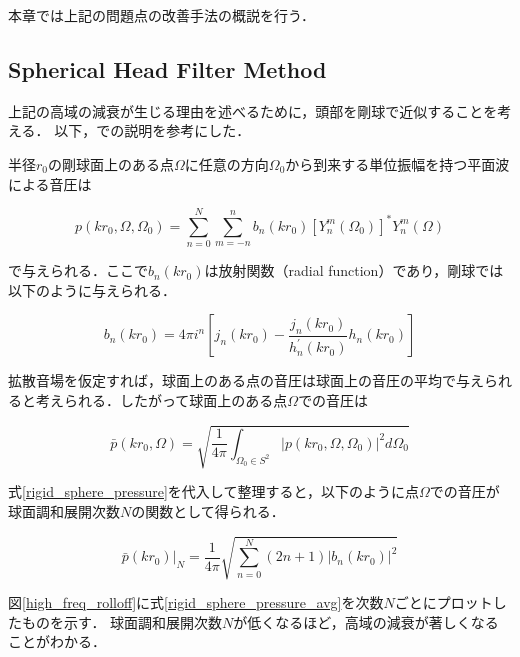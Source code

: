 \documentclass[a4paper]{jsarticle}
\begin{document}
本章では上記の問題点の改善手法の概説を行う．

\subsection{Spherical Head Filter Method \cite{Ben-Hur2017-gm,Sheaffer2014-bo}}

上記の高域の減衰が生じる理由を述べるために，頭部を剛球で近似することを考える．
以下，\cite{Ben-Hur2017-gm}での説明を参考にした．

半径$r_0$の剛球面上のある点$\Omega$に任意の方向$\Omega_0$から到来する単位振幅を持つ平面波による音圧は

\begin{equation}
    \label{rigid_sphere_pressure}
    p\left(k r_{0}, \Omega, \Omega_{0}\right)=\sum_{n=0}^{N} \sum_{m=-n}^{n} b_{n}\left(k r_{0}\right)\left[Y_{n}^{m}\left(\Omega_{0}\right)\right]^{*} Y_{n}^{m}(\Omega)
\end{equation}

で与えられる．ここで$b_n(kr_0)$は放射関数（radial function）であり，剛球では以下のように与えられる．

$$
    b_{n}\left(k r_{0}\right)=4 \pi i^{n}\left[j_{n}\left(k r_{0}\right)-\frac{j_{n}\left(k r_{0}\right)}{h_{n}^{\prime}\left(k r_{0}\right)} h_{n}\left(k r_{0}\right)\right]
$$

拡散音場を仮定すれば，球面上のある点の音圧は球面上の音圧の平均で与えられると考えられる．したがって球面上のある点$\Omega$での音圧は

$$
    \bar{p}\left(k r_{0}, \Omega\right)=\sqrt{\frac{1}{4 \pi} \int_{\Omega_{0} \in S^{2}}\left|p\left(k r_{0}, \Omega, \Omega_{0}\right)\right|^{2} d \Omega_{0}}
$$

式\ref{rigid_sphere_pressure}を代入して整理すると，以下のように点$\Omega$での音圧が球面調和展開次数$N$の関数として得られる．


\begin{equation}
    \label{rigid_sphere_pressure_avg}
    \left.\bar{p}\left(k r_{0}\right)\right|_{N}=\frac{1}{4 \pi} \sqrt{\sum_{n=0}^{N}(2 n+1)\left|b_{n}\left(k r_{0}\right)\right|^{2}}
\end{equation}

図\ref{high_freq_rolloff}に式\ref{rigid_sphere_pressure_avg}を次数$N$ごとにプロットしたものを示す．
球面調和展開次数$N$が低くなるほど，高域の減衰が著しくなることがわかる．
\end{document}

